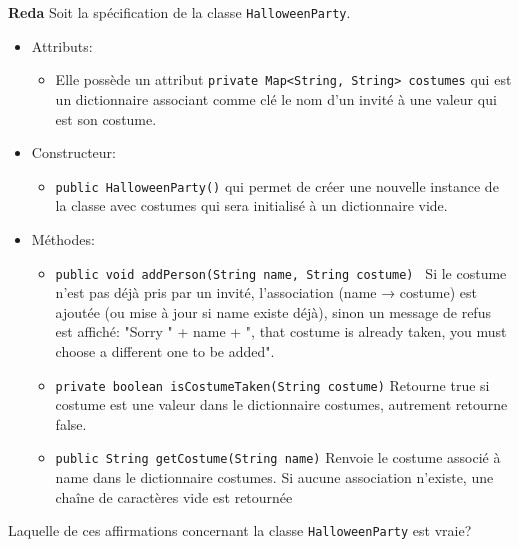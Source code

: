 \begin{Exercice}[5 minutes]\textbf{Reda}
Soit la spécification de la classe \texttt{HalloweenParty}.

\begin{itemize}
\item Attributs: \begin{itemize} \item Elle possède un attribut \lstinline[style=javastyle]{private Map<String, String> costumes} qui est un dictionnaire associant comme clé le nom d’un invité à une valeur qui est son costume. \end{itemize}
\item Constructeur: \begin{itemize} \item \lstinline[style=javastyle]{public HalloweenParty()}  qui permet de créer une nouvelle instance de la classe avec costumes qui sera initialisé à un dictionnaire vide. \end{itemize}
\item Méthodes: \begin{itemize} \item \lstinline[style=javastyle]{public void addPerson(String name, String costume) }   \newline 
                                        Si le costume n’est pas déjà pris par un invité, l’association (name → costume) est ajoutée (ou mise à jour si name existe déjà), sinon un message de refus est affiché: "Sorry " + name + ", that costume is already taken, you must choose a different one to be added".
                                \item \lstinline[style=javastyle]{private boolean isCostumeTaken(String costume)}  \newline 
                                        Retourne true si costume est une valeur dans le dictionnaire costumes, autrement retourne false.
                                \item \lstinline[style=javastyle]{public String getCostume(String name)}  \newline 
                                        Renvoie le costume associé à name dans le dictionnaire costumes. Si aucune association n’existe, une chaîne de caractères vide est retournée 
\end{itemize}
\end{itemize}

Laquelle de ces affirmations concernant la classe \texttt{HalloweenParty} est vraie?


\end{Exercice}
